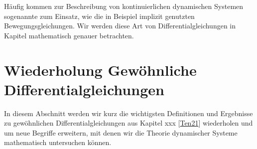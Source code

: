 \documentclass[letterpaper,10pt,english]{jupyterBook}
\begin{document}
Häufig kommen zur Beschreibung von kontinuierlichen dynamischen Systemen sogenannte  zum Einsatz, wie die in Beispiel {\hyperref[\detokenize{ode/dynamicSystems:ex:freefall}]{}} implizit genutzten Bewegungsgleichungen.
Wir werden diese Art von Differentialgleichungen in Kapitel {\hyperref[\detokenize{ode/fluesse:s-fluesse}]{}} mathematisch genauer betrachten.


\section{Wiederholung Gewöhnliche Differentialgleichungen}
\label{\detokenize{ode/repetition:wiederholung-gewohnliche-differentialgleichungen}}\label{\detokenize{ode/repetition::doc}}
In diesem Abschnitt werden wir kurz die wichtigsten Definitionen und Ergebnisse zu gewöhnlichen Differentialgleichungen aus Kapitel xxx {[}\hyperlink{cite.references:id10}{Ten21}{]} wiederholen und um neue Begriffe erweitern, mit denen wir die Theorie dynamischer Systeme mathematisch untersuchen können.
\end{document}
